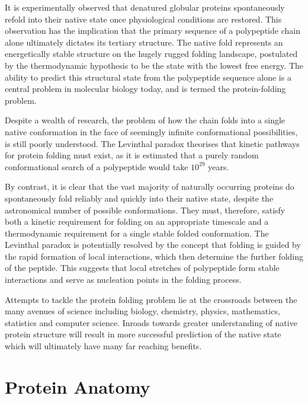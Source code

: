 It is experimentally observed that denatured globular
proteins spontaneously refold into their native state once physiological
conditions are restored. This observation has the implication that the primary sequence of a polypeptide chain alone ultimately dictates its tertiary structure. The native fold represents an energetically stable structure on the hugely rugged folding landscape, postulated by the thermodynamic hypothesis to be the state with the lowest free energy\cite{NATIVE:Anfinsen1973}. The ability to predict this structural state from the polypeptide sequence alone is a central problem in molecular biology today, and is termed the
protein-folding problem. 

Despite a wealth of research, the problem of how the
chain folds into a single native conformation in the face of seemingly infinite conformational possibilities, is still poorly understood. The Levinthal paradox\cite{NATIVE:Levinthal1968} theorises that kinetic pathways for protein folding must exist, as it is estimated that a purely random conformational search of a  polypeptide would take $10^{29}$ years\cite{NATIVE:Dobson1998}. 

By contrast, it is clear that the vast majority of naturally occurring proteins do spontaneously fold reliably and quickly into their native state, despite the astronomical number of possible conformations. They must, therefore, satisfy both a kinetic requirement for folding on an appropriate timescale and a thermodynamic requirement for a single stable folded conformation. The Levinthal paradox
is potentially
resolved by the concept that folding is guided by the rapid formation of local interactions, which then determine the further folding of the peptide. This suggests that local stretches of polypeptide form stable interactions and serve as nucleation points in the folding process.
 

Attempts to tackle the protein folding problem lie at the crossroads between the many avenues of science including biology, chemistry, physics, mathematics, statistics and computer science. Inroads towards greater understanding of native protein structure will result in more successful prediction of the native state
which will ultimately have many far reaching benefits.










\section{Protein Anatomy}

